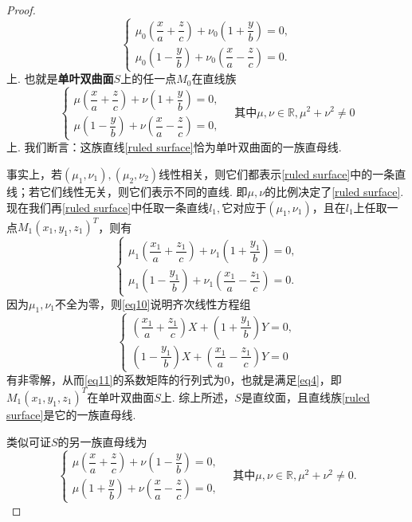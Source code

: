 \documentclass[12pt, a4paper,newtx]{ctexart}
\begin{document}
\begin{proof}
\begin{equation}
		\begin{cases}
			\mu_0\left(\dfrac{x}a+\dfrac{z}{c}\right)+\nu_0\left(1+\dfrac{y}{b}\right)=0,\\\mu_0\left(1-\dfrac{y}{b}\right)+\nu_0\left(\dfrac{x}a-\dfrac{z}{c}\right)=0.
		\end{cases}
	\end{equation}
	上. 也就是\textbf{单叶双曲面}$S$上的任一点$M_0$在直线族
	\begin{equation}\label{ruled surface}
		\begin{cases}
			\mu\left(\dfrac{x}a+\dfrac{z}{c}\right)+\nu\left(1+\dfrac{y}{b}\right)=0,\\\mu\left(1-\dfrac{y}{b}\right)+\nu\left(\dfrac{x}a-\dfrac{z}{c}\right)=0,
		\end{cases}\quad\text{其中}\mu,\nu\in\mathbb R,\mu^2+\nu^2\ne0
	\end{equation}上. 我们断言：这族直线\eqref{ruled surface}恰为单叶双曲面的一族直母线. 
	
	事实上，若$(\mu_1,\nu_1),(\mu_2,\nu_2)$线性相关，则它们都表示\eqref{ruled surface}中的一条直线；若它们线性无关，则它们表示不同的直线. 即$\mu,\nu$的比例决定了\eqref{ruled surface}. 现在我们再\eqref{ruled surface}中任取一条直线$l_1,$它对应于$(\mu_1,\nu_1)$，且在$l_1$上任取一点$M_1(x_1,y_1,z_1)^T$，则有\begin{equation}\label{eq10}
		\begin{cases}
			\mu_1\left(\dfrac{x_1}a+\dfrac{z_1}{c}\right)+\nu_1\left(1+\dfrac{y_1}{b}\right)=0,\\\mu_1\left(1-\dfrac{y_1}{b}\right)+\nu_1\left(\dfrac{x_1}a-\dfrac{z_1}{c}\right)=0.
		\end{cases}
	\end{equation}
	因为$\mu_1,\nu_1$不全为零，则\eqref{eq10}说明齐次线性方程组\begin{equation}\label{eq11}
		\begin{cases}
			\left(\dfrac{x_1}a+\dfrac{z_1}{c}\right)X+\left(1+\dfrac{y_1}{b}\right)Y=0,\\\left(1-\dfrac{y_1}{b}\right)X+\left(\dfrac{x_1}a-\dfrac{z_1}{c}\right)Y=0
		\end{cases}
	\end{equation}
	有非零解，从而\eqref{eq11}的系数矩阵的行列式为0，也就是满足\eqref{eq4}，即$M_1(x_1,y_1,z_1)^T$在单叶双曲面$S$上. 综上所述，$S$是直纹面，且直线族\eqref{ruled surface}是它的一族直母线. 
	
	类似可证$S$的另一族直母线为\begin{equation}
		\label{ruled surface2}
		\begin{cases}
			\mu\left(\dfrac{x}a+\dfrac{z}{c}\right)+\nu\left(1-\dfrac{y}{b}\right)=0,\\\mu\left(1+\dfrac{y}{b}\right)+\nu\left(\dfrac{x}a-\dfrac{z}{c}\right)=0,
		\end{cases}\quad\text{其中}\mu,\nu\in\mathbb R,\mu^2+\nu^2\ne0.
	\end{equation}
\end{proof}
\end{document}
